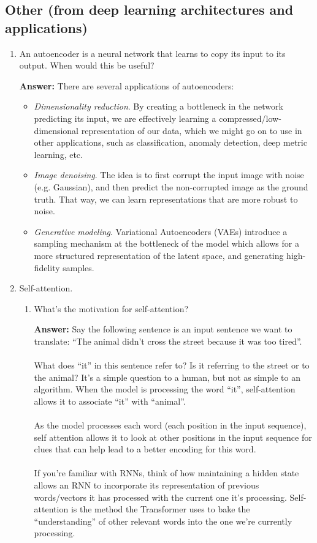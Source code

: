 \documentclass{article}
\newenvironment{QandA}{\begin{enumerate}[label=\arabic*.]}{\end{enumerate}}
\newenvironment{InnerQandA}{\begin{enumerate}[label=\roman*.]}{\end{enumerate}}
\newenvironment{answer}{\par\normalfont \textbf{Answer:}}{}
\begin{document}
\subsection{Other (from deep learning architectures and applications)}
\begin{QandA}
    \item An autoencoder is a neural network that learns to copy its input to its output. When would this be useful?
    \begin{answer}
        There are several applications of autoencoders:
        \begin{itemize}
            \item \textit{Dimensionality reduction}. By creating a bottleneck in the network predicting its input, we are effectively learning a compressed/low-dimensional representation of our data, which we might go on to use in other applications, such as classification, anomaly detection, deep metric learning, etc.
            \item \textit{Image denoising}. The idea is to first corrupt the input image with noise (e.g. Gaussian), and then predict the non-corrupted image as the ground truth. That way, we can learn representations that are more robust to noise. 
            \item \textit{Generative modeling}. Variational Autoencoders (VAEs) introduce a sampling mechanism at the bottleneck of the model which allows for a more structured representation of the latent space, and generating high-fidelity samples. 
        \end{itemize}
    \end{answer}

    \item Self-attention.
    \begin{InnerQandA}
        \item What’s the motivation for self-attention?
        \begin{answer}
            Say the following sentence is an input sentence we want to translate: ``The animal didn't cross the street because it was too tired''. \\\\
            What does “it” in this sentence refer to? Is it referring to the street or to the animal? It’s a simple question to a human, but not as simple to an algorithm. When the model is processing the word “it”, self-attention allows it to associate “it” with “animal”. \\\\
            As the model processes each word (each position in the input sequence), self attention allows it to look at other positions in the input sequence for clues that can help lead to a better encoding for this word.\\\\
            If you’re familiar with RNNs, think of how maintaining a hidden state allows an RNN to incorporate its representation of previous words/vectors it has processed with the current one it’s processing. Self-attention is the method the Transformer uses to bake the “understanding” of other relevant words into the one we’re currently processing.


\end{answer}
\end{InnerQandA}
\end{QandA}
\end{document}
